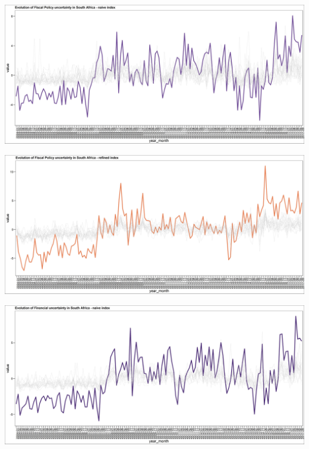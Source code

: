\documentclass[11pt,preprint, authoryear]{elsarticle}
\let\origfigure\figure
\let\endorigfigure\endfigure
\renewenvironment{figure}[1][2] {
    \expandafter\origfigure\expandafter[H]
} {
    \endorigfigure
}
\numberwithin{equation}{section}
\numberwithin{figure}{section}
\numberwithin{table}{section}
\begin{document}
\begin{figure}
	\centering
	\includegraphics[width=\linewidth, keepaspectratio]{bin/fiscal_comp_naive}\\
	\caption{Composite Fiscal Policy uncertainty naive index. \label{fig_fis_comp_n}}
\end{figure}

\begin{figure}
	\centering
	\includegraphics[width=\linewidth, keepaspectratio]{bin/fiscal_comp_refine}\\	
	\caption{Composite Fiscal Policy uncertainty refined index. \label{fig_fis_comp_r}}
\end{figure}

\begin{figure}
	\centering
	\includegraphics[width=\linewidth, keepaspectratio]{bin/financial_comp_naive}\\
	\caption{Composite Financial market uncertainty naive index. \label{fig_fin_comp_n}}
\end{figure}
\end{document}
